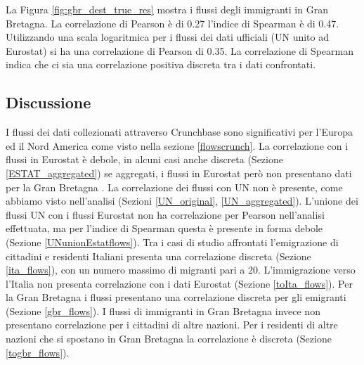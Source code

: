 La Figura \ref{fig:gbr_dest_true_res} mostra i flussi degli immigranti in Gran Bretagna. La correlazione di Pearson è di 0.27 l'indice di Spearman è di 0.47. Utilizzando una scala logaritmica per i flussi dei dati ufficiali (UN unito ad Eurostat) si ha una correlazione di Pearson di 0.35.
La correlazione di Spearman indica che ci sia una correlazione positiva discreta tra i dati confrontati.
\FloatBarrier

\subsection{Discussione}
I flussi dei dati collezionati attraverso Crunchbase sono significativi per l'Europa ed il Nord America come visto nella sezione \ref{flowscrunch}. 
La correlazione con i flussi in Eurostat è debole, in alcuni casi anche discreta (Sezione \ref{ESTAT_aggregated}) se aggregati, i flussi in Eurostat però non presentano dati per la Gran Bretagna \cite{MIMIDOC}. 
La correlazione dei flussi con UN non è presente, come abbiamo visto nell'analisi (Sezioni \ref{UN_original}, \ref{UN_aggregated}). 
L'unione dei flussi UN con i flussi Eurostat non ha correlazione per Pearson nell'analisi effettuata, ma per l'indice di Spearman questa è presente in forma debole (Sezione \ref{UNunionEstatflows}). 
Tra i casi di studio affrontati l'emigrazione di cittadini e residenti Italiani presenta una correlazione discreta (Sezione \ref{ita_flows}), con un numero massimo di migranti pari a 20. 
L'immigrazione verso l'Italia non presenta correlazione con i dati Eurostat (Sezione \ref{toIta_flows}). 
Per la Gran Bretagna i flussi presentano una correlazione discreta per gli emigranti (Sezione \ref{gbr_flows}). I flussi di immigranti in Gran Bretagna invece non presentano correlazione per i cittadini di altre nazioni. Per i residenti di altre nazioni che si spostano in Gran Bretagna la correlazione è discreta (Sezione \ref{togbr_flows}). 